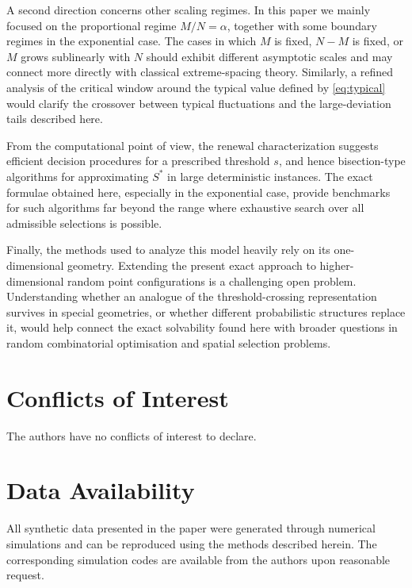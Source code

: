 \documentclass[a4paper,reqno,11pt]{amsart}
\numberwithin{equation}{section}
\numberwithin{thm}{section}
\theoremstyle{plain}
\theoremstyle{definition}
\begin{document}
{A second direction concerns other scaling regimes. In this paper we mainly
focused on the proportional regime $M/N=\alpha$, together with some boundary
regimes in the exponential case. The cases in which $M$ is fixed, $N-M$ is
fixed, or $M$ grows sublinearly with $N$ should exhibit different asymptotic
scales and may connect more directly with classical extreme-spacing theory.
Similarly, a refined analysis of the critical window around the typical
value defined by \eqref{eq:typical} would clarify the crossover between typical
fluctuations and the large-deviation tails described here.

From the computational point of view, the renewal characterization suggests
efficient decision procedures for a prescribed threshold $s$, and hence
bisection-type algorithms for approximating $S^*$ in large deterministic
instances. The exact formulae obtained here, especially in the exponential
case, provide benchmarks for such algorithms far beyond the range where
exhaustive search over all admissible selections is possible. 

Finally, the {methods used to analyze this model heavily rely on its one-dimensional geometry.} Extending the present exact
approach to higher-dimensional random point configurations is a challenging open problem. Understanding whether an
analogue of the threshold-crossing representation survives in special
geometries, or whether different probabilistic structures replace it, would
help connect the exact solvability found here with broader questions in random
combinatorial optimisation and spatial selection problems.

\section*{Conflicts of Interest}

The authors have no conflicts of interest to declare.


\section*{Data Availability}
{All synthetic data presented in the paper were generated through numerical simulations and can be reproduced using the methods described herein. The corresponding simulation codes are available from the authors upon reasonable request.}

}
\end{document}
